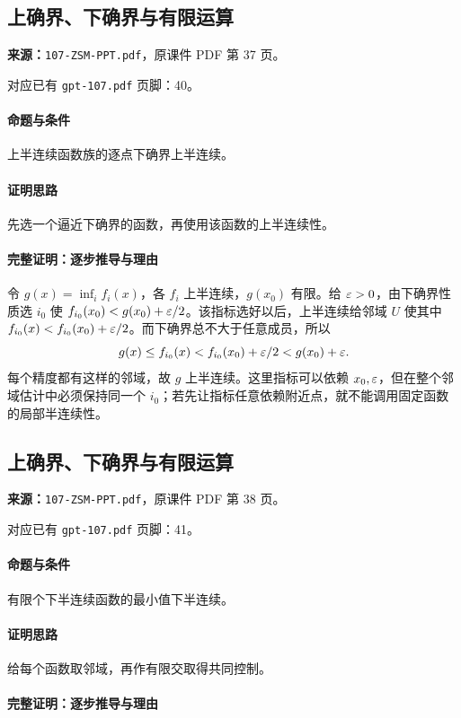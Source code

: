 \clearpage\subsection{上确界、下确界与有限运算}
\textbf{来源：}\texttt{107-ZSM-PPT.pdf}，原课件 PDF 第 37 页。\par
对应已有 \texttt{gpt-107.pdf} 页脚：40。\par
\paragraph{命题与条件}上半连续函数族的逐点下确界上半连续。
\paragraph{证明思路}先选一个逼近下确界的函数，再使用该函数的上半连续性。
\paragraph{完整证明：逐步推导与理由}

令 $g(x)=\inf_i f_i(x)$，各 $f_i$ 上半连续，$g(x_0)$ 有限。给 $\varepsilon>0$，由下确界性质选 $i_0$ 使 $f_{i_0}(x_0)<g(x_0)+\varepsilon/2$。该指标选好以后，上半连续给邻域 $U$ 使其中 $f_{i_0}(x)<f_{i_0}(x_0)+\varepsilon/2$。而下确界总不大于任意成员，所以
\[g(x)\le f_{i_0}(x)<f_{i_0}(x_0)+\varepsilon/2<g(x_0)+\varepsilon.\]
每个精度都有这样的邻域，故 $g$ 上半连续。这里指标可以依赖 $x_0,\varepsilon$，但在整个邻域估计中必须保持同一个 $i_0$；若先让指标任意依赖附近点，就不能调用固定函数的局部半连续性。

\clearpage\subsection{上确界、下确界与有限运算}
\textbf{来源：}\texttt{107-ZSM-PPT.pdf}，原课件 PDF 第 38 页。\par
对应已有 \texttt{gpt-107.pdf} 页脚：41。\par
\paragraph{命题与条件}有限个下半连续函数的最小值下半连续。
\paragraph{证明思路}给每个函数取邻域，再作有限交取得共同控制。
\paragraph{完整证明：逐步推导与理由}

